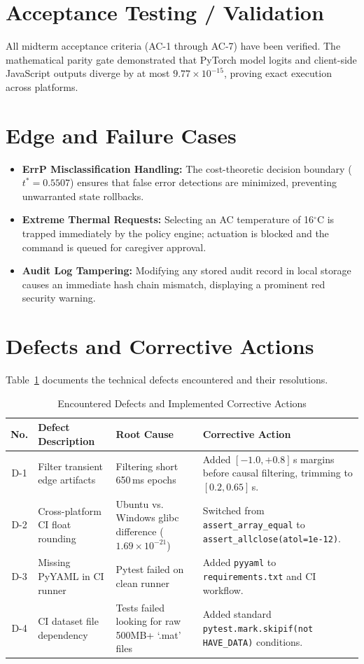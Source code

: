 \documentclass[12pt,a4paper]{report}
\begin{document}
\section{Acceptance Testing / Validation}
All midterm acceptance criteria (AC-1 through AC-7) have been verified. The mathematical parity gate demonstrated that PyTorch model logits and client-side JavaScript outputs diverge by at most $9.77 \times 10^{-15}$, proving exact execution across platforms.

\section{Edge and Failure Cases}
\begin{itemize}[leftmargin=1.5em]
    \item \textbf{ErrP Misclassification Handling:} The cost-theoretic decision boundary ($t^* = 0.5507$) ensures that false error detections are minimized, preventing unwarranted state rollbacks.
    \item \textbf{Extreme Thermal Requests:} Selecting an AC temperature of 16$^\circ$C is trapped immediately by the policy engine; actuation is blocked and the command is queued for caregiver approval.
    \item \textbf{Audit Log Tampering:} Modifying any stored audit record in local storage causes an immediate hash chain mismatch, displaying a prominent red security warning.
\end{itemize}

\section{Defects and Corrective Actions}
Table~\ref{tab:defects} documents the technical defects encountered and their resolutions.

\begin{table}[H]
\centering
\small
\caption{Encountered Defects and Implemented Corrective Actions}
\label{tab:defects}
\begin{tabularx}{\textwidth}{c p{3.8cm} p{4.5cm} X}
\toprule
\textbf{No.} & \textbf{Defect Description} & \textbf{Root Cause} & \textbf{Corrective Action} \\
\midrule
D-1 & Filter transient edge artifacts & Filtering short 650\,ms epochs & Added $[-1.0, +0.8]$\,s margins before causal filtering, trimming to $[0.2, 0.65]$\,s. \\
\addlinespace
D-2 & Cross-platform CI float rounding & Ubuntu vs. Windows glibc difference ($1.69 \times 10^{-21}$) & Switched from \texttt{assert\_array\_equal} to \texttt{assert\_allclose(atol=1e-12)}. \\
\addlinespace
D-3 & Missing PyYAML in CI runner & Pytest failed on clean runner & Added \texttt{pyyaml} to \texttt{requirements.txt} and CI workflow. \\
\addlinespace
D-4 & CI dataset file dependency & Tests failed looking for raw 500MB+ `.mat' files & Added standard \texttt{pytest.mark.skipif(not HAVE\_DATA)} conditions. \\
\bottomrule
\end{tabularx}
\end{table}
\end{document}
